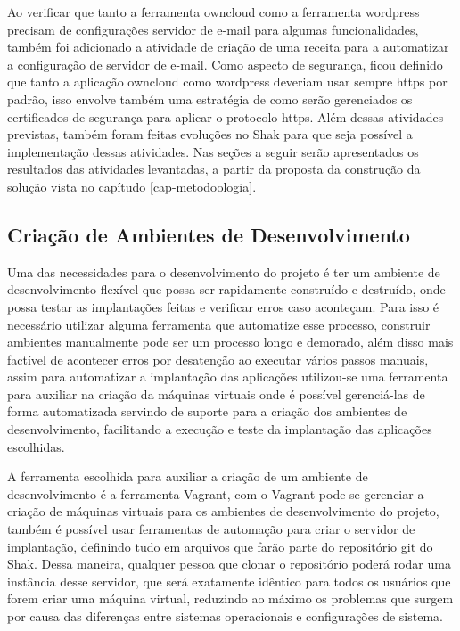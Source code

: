 Ao verificar que tanto a ferramenta owncloud como a ferramenta wordpress precisam
de configurações servidor de e-mail para algumas funcionalidades, também foi adicionado
a atividade de criação de uma receita para a automatizar a configuração de
servidor de e-mail. Como aspecto de segurança, ficou definido que tanto a aplicação
owncloud como wordpress deveriam usar sempre https por padrão, isso envolve também
uma estratégia de como serão gerenciados os certificados de segurança para aplicar
o protocolo https. Além dessas atividades previstas, também foram feitas evoluções
no Shak para que seja possível a implementação dessas atividades. Nas seções a
seguir serão apresentados os resultados das atividades levantadas, a partir da
proposta da construção da solução vista no capítudo \ref{cap-metodoologia}.

\subsection{Criação de Ambientes de Desenvolvimento}

Uma das necessidades para o desenvolvimento do projeto é ter um ambiente de desenvolvimento
flexível que possa ser rapidamente construído e destruído, onde possa testar as
implantações feitas e verificar erros caso aconteçam. Para isso é necessário utilizar
alguma ferramenta que automatize esse processo, construir ambientes manualmente pode
ser um processo longo e demorado, além disso mais factível de acontecer erros por
desatenção ao executar vários passos manuais, assim para automatizar a implantação
das aplicações utilizou-se uma ferramenta para auxiliar na criação da máquinas virtuais onde é
possível gerenciá-las de forma automatizada servindo de suporte para a criação
dos ambientes de desenvolvimento, facilitando a execução e teste da implantação das
aplicações escolhidas.

A ferramenta escolhida para auxiliar a criação de um ambiente de desenvolvimento é
a ferramenta Vagrant, com o Vagrant pode-se gerenciar a criação de máquinas
virtuais para os ambientes de desenvolvimento do projeto, também é possível usar
ferramentas de automação para criar o servidor de implantação, definindo tudo
em arquivos que farão parte do repositório git do Shak. Dessa maneira,
qualquer pessoa que clonar o repositório poderá rodar uma instância desse servidor, que será exatamente
idêntico para todos os usuários que forem criar uma máquina virtual, reduzindo ao
máximo os problemas que surgem por causa das diferenças entre sistemas operacionais e configurações de sistema.

